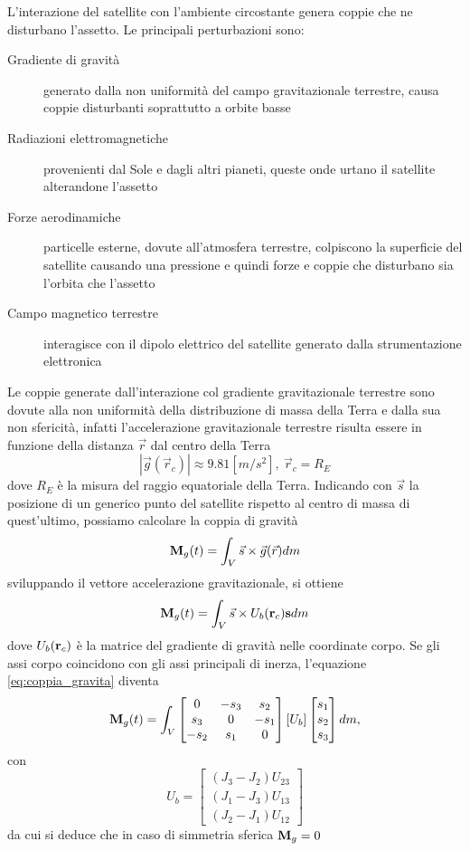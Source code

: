 L'interazione del satellite con l'ambiente circostante genera coppie che ne
disturbano l'assetto. Le principali perturbazioni sono:
\begin{description}
\item[Gradiente di gravità] generato dalla non uniformità del campo
gravitazionale terrestre, causa coppie disturbanti soprattutto a orbite basse
\item[Radiazioni elettromagnetiche] provenienti dal Sole e dagli altri pianeti,
queste onde urtano il satellite alterandone l'assetto
\item[Forze aerodinamiche] particelle esterne, dovute all'atmosfera terrestre,
colpiscono la superficie del satellite causando una pressione e quindi forze e
coppie che disturbano sia l'orbita che l'assetto
\item[Campo magnetico terrestre] interagisce con il dipolo elettrico del
satellite generato dalla strumentazione elettronica
\end{description}

Le coppie generate dall'interazione col gradiente gravitazionale terrestre sono
dovute alla non uniformità della distribuzione di massa della Terra e dalla
sua non sfericità, infatti l'accelerazione gravitazionale terrestre risulta
essere in funzione della distanza $\vec{r}$ dal centro della Terra
\begin{equation}
|\vec{g}(\vec{r}_c)|\approx9.81 [m/s^2], \ \vec{r}_c=R_E
\end{equation}
dove $R_E$ è la misura del raggio equatoriale della Terra.
Indicando con $\vec{s}$ la posizione di un generico punto del satellite rispetto
al centro di massa di quest'ultimo, possiamo calcolare la coppia di gravità
\begin{equation}
{\bf M}_g(t)=\int_V\vec{s}\times\vec{g}(\vec{r})dm
\end{equation}
sviluppando il vettore accelerazione gravitazionale, si ottiene
\begin{equation}
{\bf M}_g(t)=\int_V\vec{s}\times U_b({\bf r}_c){\bf s}dm
\label{eq:coppia_gravita}
\end{equation}
dove $U_b({\bf r}_c)$ è la matrice del gradiente di gravità nelle coordinate
corpo. Se gli assi corpo coincidono con gli assi principali di inerza,
l'equazione \ref{eq:coppia_gravita} diventa
\begin{equation}
{\bf M}_g(t)=\int_V 
\begin{bmatrix}
0 & -s_3 & s_2 \\
s_3 & 0 & -s_1 \\
-s_2 & s_1 & 0
\end{bmatrix}
[U_b]\begin{bmatrix}
s_1 \\ s_2 \\ s_3
\end{bmatrix} dm,
\end{equation}
con
\[ U_b=
\begin{bmatrix}
(J_3-J_2)U_{23} \\ (J_1-J_3)U_{13} \\ (J_2-J_1)U_{12}
\end{bmatrix}
\]
da cui si deduce che in caso di simmetria sferica ${\bf M}_g=0$


